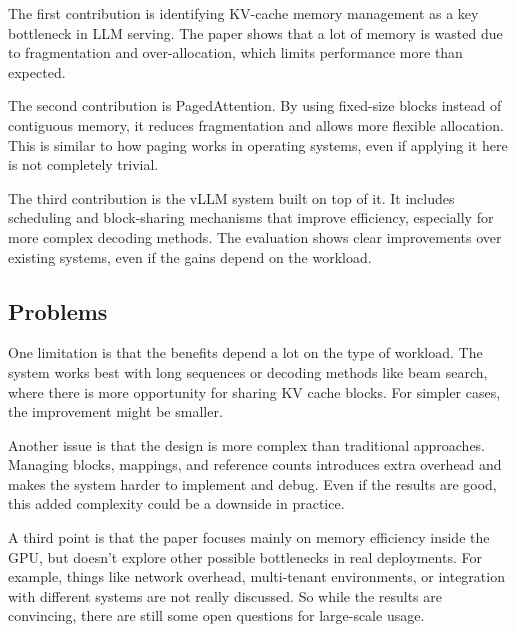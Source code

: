 \documentclass[a4paper, 12pt]{article}
\begin{document}
The first contribution is identifying KV-cache memory management as a key bottleneck in LLM serving. The paper shows that a lot of memory is wasted due to fragmentation and over-allocation, which limits performance more than expected.

The second contribution is PagedAttention. By using fixed-size blocks instead of contiguous memory, it reduces fragmentation and allows more flexible allocation. This is similar to how paging works in operating systems, even if applying it here is not completely trivial.

The third contribution is the vLLM system built on top of it. It includes scheduling and block-sharing mechanisms that improve efficiency, especially for more complex decoding methods. The evaluation shows clear improvements over existing systems, even if the gains depend on the workload.

\subsection{Problems}

One limitation is that the benefits depend a lot on the type of workload. The system works best with long sequences or decoding methods like beam search, where there is more opportunity for sharing KV cache blocks. For simpler cases, the improvement might be smaller.

Another issue is that the design is more complex than traditional approaches. Managing blocks, mappings, and reference counts introduces extra overhead and makes the system harder to implement and debug. Even if the results are good, this added complexity could be a downside in practice.

A third point is that the paper focuses mainly on memory efficiency inside the GPU, but doesn’t explore other possible bottlenecks in real deployments. For example, things like network overhead, multi-tenant environments, or integration with different systems are not really discussed. So while the results are convincing, there are still some open questions for large-scale usage.
\end{document}
